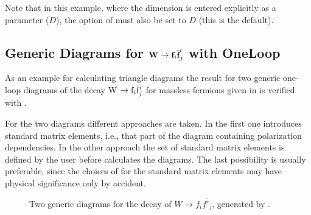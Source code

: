 \enom
Note that in this example, where the dimension is entered explicitly as a 
parameter ($D$), the option  of  
must also be set to $D$ (this is the default). 

\subsection{Generic Diagrams for
${\rm {\small\tt \textbf{W}}} \rightarrow {\rm {\small\tt \textbf{f}}}_i \bar{{\small\tt \textbf{f}}}'_j$ with  OneLoop}
\label{generic}

As an example for calculating triangle diagrams the result 
for two generic one-loop diagrams of the 
decay W $\rightarrow {\rm f}_i \bar{{\rm f}'_j}$ for massless fermions
given in \cite{ansgar} 
is verified with \fc. 

For the two diagrams different approaches are taken. 
In the first one \fc introduces standard matrix elements, 
i.e., that part of the diagram containing polarization 
dependencies.
In the other approach the set of standard matrix elements is defined 
by the user before \fc calculates the diagrams.
The last possibility is usually preferable, since the choices of \fc
for the standard matrix elements may have physical significance only 
by accident.

\begin{figure}[H]
\begin{center}
\caption{Two generic diagrams for the decay of $W \rightarrow f_i \bar{f'_j}$, generated by \fa.}
\end{center}
\end{figure}

